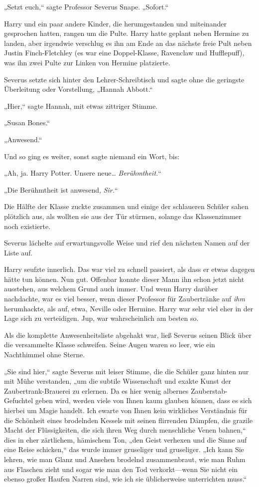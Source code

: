 {„Setzt euch,“ sagte Professor Severus Snape. „Sofort.“

Harry und ein paar andere Kinder, die herumgestanden und miteinander gesprochen hatten, rangen um die Pulte. Harry hatte geplant neben Hermine zu landen, aber irgendwie verschlug es ihn am Ende an das nächste freie Pult neben Justin Finch-Fletchley (es war eine Doppel-Klasse, Ravenclaw und Hufflepuff), was ihn zwei Pulte zur Linken von Hermine platzierte.

Severus setzte sich hinter den Lehrer-Schreibtisch und sagte ohne die geringste Überleitung oder Vorstellung, „Hannah Abbott.“

„Hier,“ sagte Hannah, mit etwas zittriger Stimme.

„Susan Bones.“

„Anwesend.“

Und so ging es weiter, sonst sagte niemand ein Wort, bis:

„Ah, ja. Harry Potter. Unsere neue… \emph{Berühmtheit.}“

„Die Berühmtheit ist anwesend, \emph{Sir.}“

Die Hälfte der Klasse zuckte zusammen und einige der schlaueren Schüler sahen plötzlich aus, als wollten sie aus der Tür stürmen, solange das Klassenzimmer noch existierte.

Severus lächelte auf erwartungsvolle Weise und rief den nächsten Namen auf der Liste auf.

Harry seufzte innerlich. Das war viel zu schnell passiert, als dass er etwas dagegen hätte tun können. Nun gut. Offenbar konnte dieser Mann ihn schon jetzt nicht ausstehen, aus welchem Grund auch immer. Und wenn Harry darüber nachdachte, war es viel besser, wenn dieser Professor für Zaubertränke auf \emph{ihm} herumhackte, als auf, etwa, Neville oder Hermine. Harry war sehr viel eher in der Lage sich zu verteidigen. Jup, war wahrscheinlich am besten so.

Als die komplette Anwesenheitsliste abgehakt war, ließ Severus seinen Blick über die versammelte Klasse schweifen. Seine Augen waren so leer, wie ein Nachthimmel ohne Sterne.

„Sie sind hier,“ sagte Severus mit leiser Stimme, die die Schüler ganz hinten nur mit Mühe verstanden, „um die subtile Wissenschaft und exakte Kunst der Zaubertrank-Brauerei zu erlernen. Da es hier wenig albernes Zauberstab-Gefuchtel geben wird, werden viele von Ihnen kaum glauben können, dass es sich hierbei um Magie handelt. Ich ewarte von Ihnen kein wirkliches Verständnis für die Schönheit eines brodelnden Kessels mit seinen flirrenden Dämpfen, die grazile Macht der Flüssigkeiten, die sich ihren Weg durch menschliche Venen bahnen,“ dies in eher zärtlichem, hämischem Ton, „den Geist verhexen und die Sinne auf eine Reise schicken,“ das wurde immer gruseliger und gruseliger. „Ich kann Sie lehren, wie man Glanz und Ansehen brodelnd zusammenbraut, wie man Ruhm aus Flaschen zieht und sogar wie man den Tod verkorkt—wenn Sie nicht ein ebenso großer Haufen Narren sind, wie ich sie üblicherweise unterrichten muss.“

}
